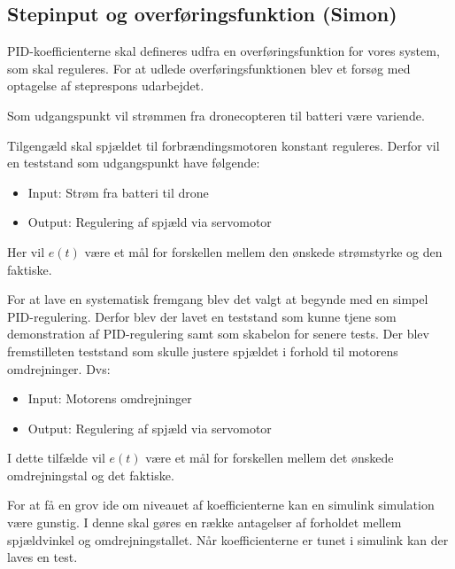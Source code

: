 \subsection{Stepinput og overføringsfunktion (Simon)}
\label{sec:tests}

PID-koefficienterne skal defineres udfra en overføringsfunktion for vores system, som skal reguleres. For at udlede overføringsfunktionen blev et forsøg med optagelse af steprespons udarbejdet.


Som udgangspunkt vil strømmen fra dronecopteren til batteri være variende.%

Tilgengæld skal spjældet til forbrændingsmotoren konstant reguleres. Derfor vil en teststand som udgangspunkt have følgende:
\begin{itemize}
\item Input: Strøm fra batteri til drone
\item Output: Regulering af spjæld via servomotor
\end{itemize}

Her vil $e(t)$ være et mål for forskellen mellem den ønskede strømstyrke og den faktiske.

For at lave en systematisk fremgang blev det valgt at begynde med en simpel PID-regulering. Derfor blev der lavet en teststand som kunne tjene som demonstration af PID-regulering samt som skabelon for senere tests. Der blev fremstilleten teststand som skulle justere spjældet i forhold til motorens omdrejninger. Dvs:

\begin{itemize}
\item Input: Motorens omdrejninger
\item Output: Regulering af spjæld via servomotor
\end{itemize}

I dette tilfælde vil $e(t)$ være et mål for forskellen mellem det ønskede omdrejningstal og det faktiske.

For at få en grov ide om niveauet af koefficienterne kan en simulink simulation være gunstig. I denne skal gøres en række antagelser af forholdet mellem spjældvinkel og omdrejningstallet. Når koefficienterne er tunet i simulink kan der laves en test.

